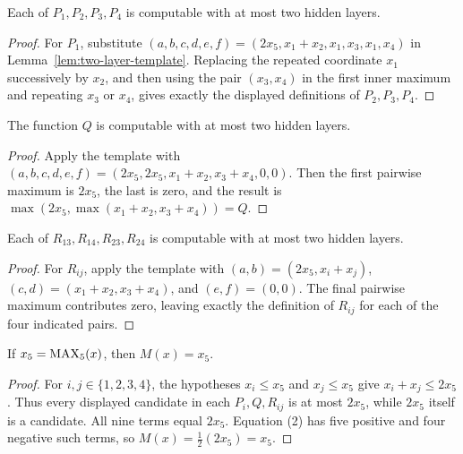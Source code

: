 \begin{lemma}
  \label{lem:p-terms-depth-two}
  Each of $P_1,P_2,P_3,P_4$ is computable with at most two hidden layers.
\end{lemma}
\begin{proof}
  For $P_1$, substitute
  $(a,b,c,d,e,f)=(2x_5,x_1+x_2,x_1,x_3,x_1,x_4)$ in
  Lemma~\ref{lem:two-layer-template}.  Replacing the repeated coordinate
  $x_1$ successively by $x_2$, and then using the pair $(x_3,x_4)$ in the
  first inner maximum and repeating $x_3$ or $x_4$, gives exactly the displayed
  definitions of $P_2,P_3,P_4$.
\end{proof}

\begin{lemma}
  \label{lem:q-depth-two}
  The function $Q$ is computable with at most two hidden layers.
\end{lemma}
\begin{proof}
  Apply the template with
  $(a,b,c,d,e,f)=(2x_5,2x_5,x_1+x_2,x_3+x_4,0,0)$.
  Then the first pairwise maximum is $2x_5$, the last is zero, and the result
  is $\max(2x_5,\max(x_1+x_2,x_3+x_4))=Q$.
\end{proof}

\begin{lemma}
  \label{lem:r-terms-depth-two}
  Each of $R_{13},R_{14},R_{23},R_{24}$ is computable with at most two hidden
  layers.
\end{lemma}
\begin{proof}
  For $R_{ij}$, apply the template with
  $(a,b)=(2x_5,x_i+x_j)$,
  $(c,d)=(x_1+x_2,x_3+x_4)$, and $(e,f)=(0,0)$.
  The final pairwise maximum contributes zero, leaving exactly the definition
  of $R_{ij}$ for each of the four indicated pairs.
\end{proof}

\begin{lemma}
  \label{lem:m-x5-case}
  If $x_5=\operatorname{MAX}_5(x)$, then $M(x)=x_5$.
\end{lemma}
\begin{proof}
  For $i,j\in\{1,2,3,4\}$, the hypotheses $x_i\leq x_5$ and
  $x_j\leq x_5$ give $x_i+x_j\leq2x_5$.  Thus every displayed candidate in
  each $P_i,Q,R_{ij}$ is at most $2x_5$, while $2x_5$ itself is a candidate.
  All nine terms equal $2x_5$.  Equation (2) has five positive and four
  negative such terms, so $M(x)=\tfrac12(2x_5)=x_5$.
\end{proof}

